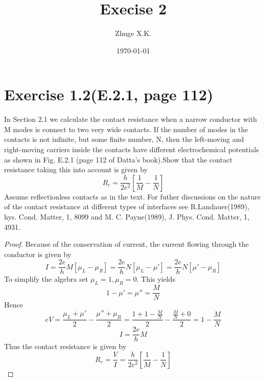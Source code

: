 \documentclass[11pt,a4paper]{article}
\title{Execise 2}
\author{Zhuge X.K.}
\date{\today}
\theoremstyle{plain}
\theoremstyle{definition}
\theoremstyle{remark}
\begin{document}
\maketitle
\section*{Exercise 1.2(E.2.1, page 112)}
In Section 2.1 we calculate the contact resistance when a narrow conductor with M modes is connect to two very wide contacts. If the number of modes in the contacts is not infinite, but some finite number, N, then the left-moving and right-moving carriers inside the contacts have different electrochemical potentials as shown in Fig. E.2.1 (page 112 of Datta's book).Show that the contact resistance taking this into account is given by
\[
    R_c = \frac{h}{2e^2}\left[\frac{1}{M}-\frac{1}{N}\right]
\]
Assume reflectionless contacts as in the text. For futher discussions on the nature of the contact resistance at different types of interfaces see R.Landauer(1989), hys. Cond. Matter, 1, 8099 and M. C. Payne(1989), J. Phys. Cond. Matter, 1, 4931.

\begin{proof}
Because of the conservation of current, the current flowing through the conductor is given by
\begin{equation}
    I = \frac{2e}{h}M[\mu_L - \mu_R] = \frac{2e}{h}N[\mu_L - \mu'] = \frac{2e}{h}N[\mu' - \mu_R]
\end{equation}
To simplify the algebra set $\mu_L = 1, \mu_R = 0$. This yields
\begin{equation}
    1 - \mu' = \mu'' = \frac{M}{N}
\end{equation}
Hence 
\begin{equation}
    eV = \frac{\mu_L + \mu'}{2} - \frac{\mu'' + \mu_R}{2} = \frac{1 + 1 - \frac{M}{N}}{2} - \frac{\frac{M}{N} + 0}{2} = 1 - \frac{M}{N}
\end{equation}
\begin{equation}
    I = \frac{2e}{h}M
\end{equation}
Thus the contact resistance is given by
\begin{equation}
    R_c = \frac{V}{I} = \frac{h}{2e^2}\left[\frac{1}{M} - \frac{1}{N}\right]
\end{equation}
\end{proof}
\end{document}
